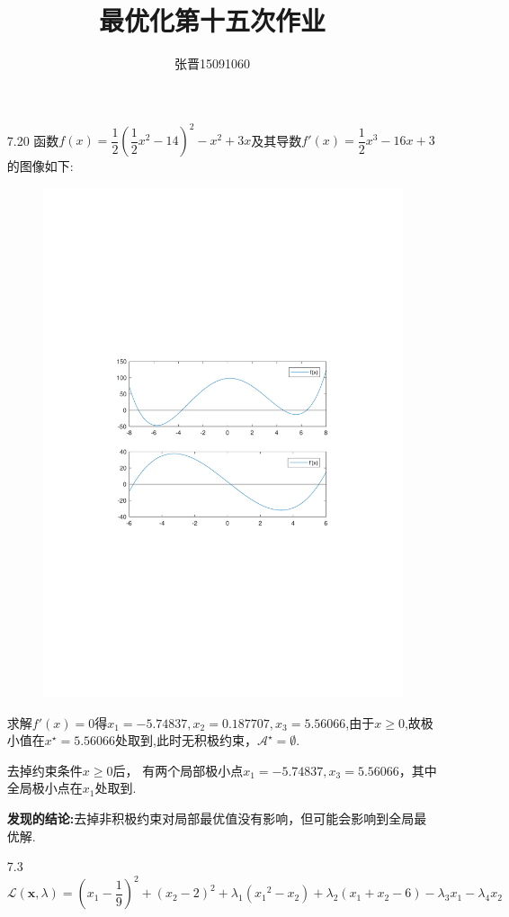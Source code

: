 \documentclass[UTF8]{ctexart}
\title{\heiti 最优化第十五次作业}
\author{\kaishu 张晋15091060}
\begin{document}
\maketitle


\begin{enumerate}
\item[7.20]
函数$f(x)=\dfrac{1}{2}(\dfrac{1}{2}x^2-14)^2-x^2+3x$及其导数$f'(x)=\dfrac{1}{2}x^3-16x+3$的图像如下:


\begin{figure}[H]
\centering
\includegraphics[width=11cm]{1.pdf}
\end{figure}

求解$f'(x)=0$得$x_1=-5.74837,x_2=0.187707,x_3=5.56066$,由于$x\geq 0$,故极小值在$x^{\star}=5.56066$处取到,此时无积极约束，$\mathcal{A}^{\star}=\emptyset$.

去掉约束条件$x \geq 0$后，
有两个局部极小点$x_1=-5.74837,x_3=5.56066$，其中全局极小点在$x_1$处取到.

\textbf{发现的结论:}去掉非积极约束对局部最优值没有影响，但可能会影响到全局最优解.

\item[7.3]
\[\mathcal{L}(\bm{x},\lambda)=(x_1-\dfrac{1}{9})^2+(x_2-2)^2+\lambda_1({x_1}^2-x_2)+\lambda_2(x_1+x_2-6)-\lambda_3x_1-\lambda_4x_2\]


\end{enumerate}
\end{document}
